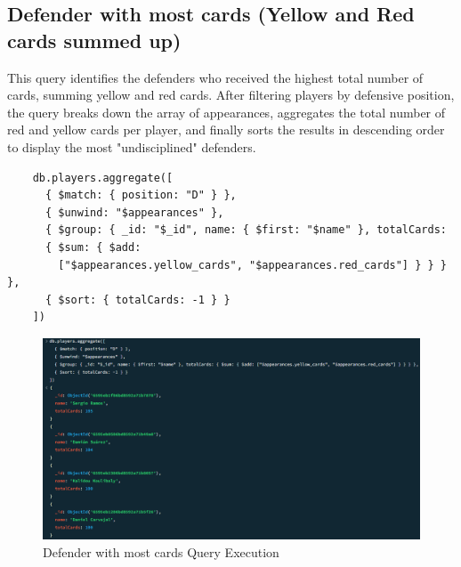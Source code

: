 \documentclass{Configuration_Files/PoliMi3i_thesis}
\begin{document}
\subsection{Defender with most cards (Yellow and Red cards summed up)}
This query identifies the defenders who received the highest total number of cards, summing yellow and red cards. After filtering players by defensive position, the query breaks down the array of appearances, aggregates the total number of red and yellow cards per player, and finally sorts the results in descending order to display the most "undisciplined" defenders.
\begin{verbatim}
    db.players.aggregate([
      { $match: { position: "D" } },
      { $unwind: "$appearances" },
      { $group: { _id: "$_id", name: { $first: "$name" }, totalCards: 
      { $sum: { $add: 
        ["$appearances.yellow_cards", "$appearances.red_cards"] } } } },
      { $sort: { totalCards: -1 } }
    ])
\end{verbatim}

\begin{figure}[htbp]
    \centering
    \includegraphics[scale=0.7]{Images/Queries/Defenders_most_cards/dmc.png}
    \caption{Defender with most cards  Query Execution}
\end{figure}
\end{document}
